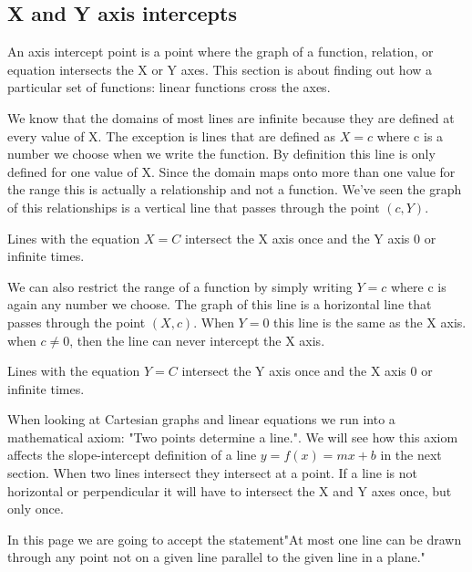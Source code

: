 \subsection{X and Y axis intercepts}
\label{sss:xand-5717}




An axis intercept point is a point where the graph of a function, relation, or equation
intersects the X or Y axes. This section is about finding out how a particular set of
functions: linear functions cross the axes.



We know that the domains of most lines are infinite because they are defined at every
value of X. The exception is lines that are defined as $X=c$ where c is a number we choose
when we write the function. By definition this line is only defined for one value of X.
Since the domain maps onto more than one value for the range this is actually a
relationship and not a function. We've seen the graph of this relationships is a vertical
line that passes through the point $(c,Y)$.



Lines with the equation $X=C$ intersect the X axis once and the Y axis 0 or infinite times.



We can also restrict the range of a function by simply writing $Y=c$ where c is again any
number we choose. The graph of this line is a horizontal line that passes through the
point $(X,c)$. When $Y=0$ this line is the same as the X axis. when $c \ne 0$, then the
line can never intercept the X axis.



Lines with the equation $Y=C$ intersect the Y axis once and the X axis 0 or infinite times.



When looking at Cartesian graphs and linear equations we run into a mathematical axiom:
"Two points determine a line.". We will see how this axiom affects the slope-intercept
definition of a line $y= f(x) = m x + b$ in the next section. When two lines intersect
they intersect at a point. If a line is not horizontal or perpendicular it will have to
intersect the X and Y axes once, but only once.



In this page we are going to accept the statement"At most one line can be drawn through
any point not on a given line parallel to the given line in a plane."



